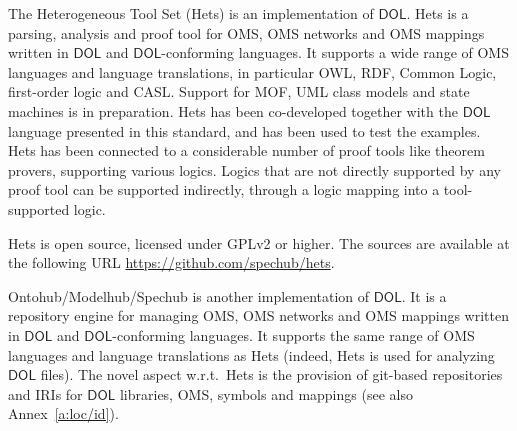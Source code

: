 \documentclass[10pt, a4paper]{isov2}
\newcommand*{\DOL}{\ensuremath{\mathsf{DOL}}\xspace}
\begin{document}
\cleardoublepage
\infannex{Tools for \DOL}\label{a:tools}


\label{a:hets} The
Heterogeneous Tool Set (Hets) is  an implementation  of
\DOL. Hets is a parsing, analysis and proof tool
for OMS, OMS networks and OMS mappings written in \DOL and
\DOL-conforming languages.  It supports a wide range of OMS languages
and language translations, in particular OWL, RDF, Common Logic,
first-order logic and CASL. Support for MOF, UML class models and
state machines is in preparation.  Hets has been co-developed together
with the \DOL language presented in this standard, and has been used to
test the examples. Hets has been connected to a considerable number of
proof tools like theorem provers, supporting various logics. Logics
that are not directly supported by any proof tool can be supported
indirectly, through a logic mapping into a tool-supported logic.

Hets  is open source, licensed under GPLv2 or higher. The sources are
available at the following URL \url{https://github.com/spechub/hets}.


\label{a:ontohub}


Ontohub/Modelhub/Spechub is  another implementation  of
\DOL. It is a repository engine for managing OMS, OMS networks and OMS
mappings written in \DOL and \DOL-conforming languages.  It supports the
same range of OMS languages and language translations as Hets (indeed,
Hets is used for analyzing \DOL files). The novel aspect w.r.t.\ Hets
is the provision of git-based repositories and IRIs for \DOL libraries,
OMS, symbols and mappings (see also Annex~\ref{a:loc/id}).
\end{document}
